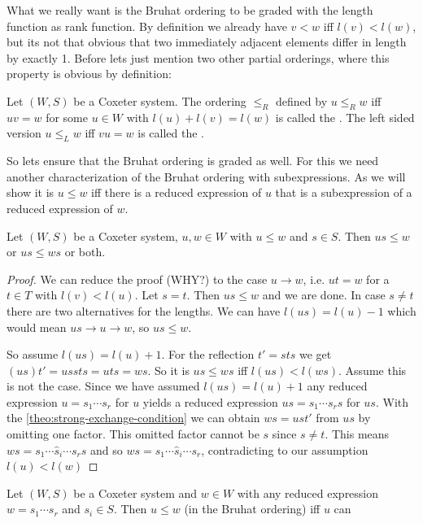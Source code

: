 What we really want is the Bruhat ordering to be graded with the length function as rank function. By definition we already have $v < w$ iff $l(v) < l(w)$, but its not that obvious that two immediately adjacent elements differ in length by exactly 1. Before lets just mention two other partial orderings, where this property is obvious by definition:

\begin{defi}
	Let $(W,S)$ be a Coxeter system. The ordering $\leq_R$ defined by $u \leq_R w$ iff $uv = w$ for some $u \in W$ with $l(u) + l(v) = l(w)$ is called the . The left sided version $u \leq_L w$ iff $vu = w$ is called the .
\end{defi}

So lets ensure that the Bruhat ordering is graded as well. For this we need another characterization of the Bruhat ordering with subexpressions. As we will show it is $u \leq w$ iff there is a reduced expression of $u$ that is a subexpression of a reduced expression of $w$.

\begin{prop}
	Let $(W,S)$ be a Coxeter system, $u,w \in W$ with $u \leq w$ and $s \in S$. Then $us \leq w$ or $us \leq ws$ or both.

	\begin{proof}
		We can reduce the proof (WHY?) to the case $u \to w$, i.e. $ut = w$ for a $t \in T$ with $l(v) < l(u)$. Let $s = t$. Then $us \leq w$ and we are done. In case $s \neq t$ there are two alternatives for the lengths. We can have $l(us) = l(u) - 1$ which would mean $us \to u \to w$, so $us \leq w$.

		So assume $l(us) = l(u) + 1$. For the reflection $t' = sts$ we get $(us)t' = ussts = uts = ws$. So it is $us \leq ws$ iff $l(us) < l(ws)$. Assume this is not the case. Since we have assumed $l(us) = l(u) + 1$ any reduced expression $u = s_1 \cdots s_r$ for $u$ yields a reduced expression $us = s_1 \cdots s_r s$ for $us$. With the \ref{theo:strong-exchange-condition} we can obtain $ws = ust'$ from $us$ by omitting one factor. This omitted factor cannot be $s$ since $s \neq t$. This means $ws = s_1 \cdots \hat s_i \cdots s_r s$ and so $ws = s_1 \cdots \hat s_i \cdots s_r$, contradicting to our assumption $l(u) < l(w)$
	\end{proof}
\end{prop}

\begin{theo}
	Let $(W,S)$ be a Coxeter system and $w \in W$ with any reduced expression $w = s_1 \cdots s_r$ and $s_i \in S$. Then $u \leq w$ (in the Bruhat ordering) iff $u$ can 
\end{theo}